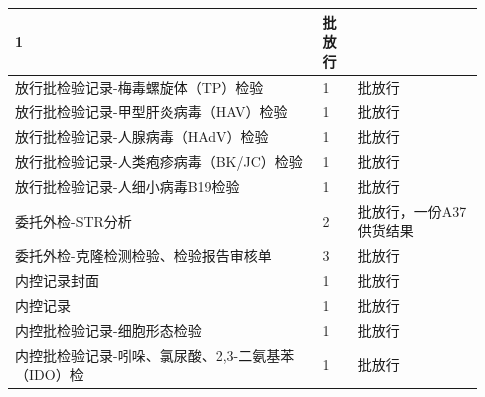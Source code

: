 \documentclass[UTF8,10pt,a4paper,fontset=fandol]{ctexart}
\newcommand{\fieldvalue}[1]{#1}
\begin{document}
\begin{center}
\begin{tabular}{|p{0.61\linewidth}|p{0.07\linewidth}|p{0.25\linewidth}|}
\fieldvalue{1} &
\fieldvalue{批放行} \\ \hline
放行批检验记录-梅毒螺旋体（TP）检验 &
\fieldvalue{1} &
\fieldvalue{批放行} \\ \hline
放行批检验记录-甲型肝炎病毒（HAV）检验 &
\fieldvalue{1} &
\fieldvalue{批放行} \\ \hline
放行批检验记录-人腺病毒（HAdV）检验 &
\fieldvalue{1} &
\fieldvalue{批放行} \\ \hline
放行批检验记录-人类疱疹病毒（BK/JC）检验 &
\fieldvalue{1} &
\fieldvalue{批放行} \\ \hline
放行批检验记录-人细小病毒B19检验 &
\fieldvalue{1} &
\fieldvalue{批放行} \\ \hline
委托外检-STR分析 &
\fieldvalue{2} &
\fieldvalue{批放行，一份A37供货结果} \\ \hline
委托外检-克隆检测检验、检验报告审核单 &
\fieldvalue{3} &
\fieldvalue{批放行} \\ \hline
内控记录封面 &
\fieldvalue{1} &
\fieldvalue{批放行} \\ \hline
内控记录 &
\fieldvalue{1} &
\fieldvalue{批放行} \\ \hline
内控批检验记录-细胞形态检验 &
\fieldvalue{1} &
\fieldvalue{批放行} \\ \hline
内控批检验记录-吲哚、氯尿酸、2,3-二氨基苯（IDO）检 &
\fieldvalue{1} &
\fieldvalue{批放行} \\ \hline

\end{tabular}
\end{center}
\end{document}
